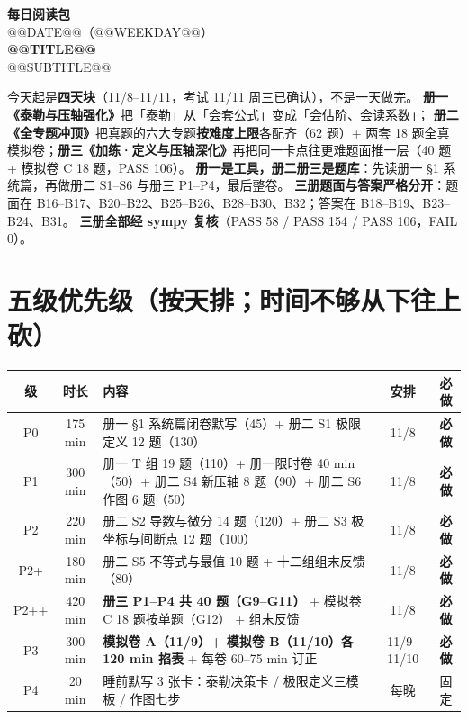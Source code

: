 \begin{center}
{\Huge\bfseries 每日阅读包}\\[0.25em]
{\LARGE @@DATE@@（@@WEEKDAY@@）}\\[0.45em]
{\Large\bfseries @@TITLE@@}\\[0.3em]
{\normalsize @@SUBTITLE@@}
\end{center}
\vspace{0.4em}
\begin{keypoint}[今天的一句话]
今天起是\textbf{四天块}（11/8--11/11，考试 11/11 周三已确认），不是一天做完。
\textbf{册一《泰勒与压轴强化》}把「泰勒」从「会套公式」变成「会估阶、会读系数」；
\textbf{册二《全专题冲顶》}把真题的六大专题\textbf{按难度上限}各配齐（62 题）+ 两套 18 题全真模拟卷；\textbf{册三《加练·定义与压轴深化》}再把同一卡点往更难题面推一层（40 题 + 模拟卷 C 18 题，PASS 106）。
\textbf{册一是工具，册二册三是题库}：先读册一 §1 系统篇，再做册二 S1--S6 与册三 P1--P4，最后整卷。
\textbf{三册题面与答案严格分开}：题面在 B16--B17、B20--B22、B25--B26、B28--B30、B32；答案在 B18--B19、B23--B24、B31。
\textbf{三册全部经 sympy 复核}（PASS 58 / PASS 154 / PASS 106，FAIL 0）。
\end{keypoint}

\section{五级优先级（按天排；时间不够从下往上砍）}
\begin{tabularx}{\linewidth}{c|c|p{6.4cm}|c|c}
\toprule
级 & 时长 & 内容 & 安排 & 必做 \\
\midrule
P0 & 175 min & 册一 §1 系统篇闭卷默写（45）+ 册二 S1 极限定义 12 题（130） & 11/8 & \textbf{必做} \\
P1 & 300 min & 册一 T 组 19 题（110）+ 册一限时卷 40 min（50）+ 册二 S4 新压轴 8 题（90）+ 册二 S6 作图 6 题（50） & 11/8 & \textbf{必做} \\
P2 & 220 min & 册二 S2 导数与微分 14 题（120）+ 册二 S3 极坐标与间断点 12 题（100） & 11/8 & \textbf{必做} \\
P2+ & 180 min & 册二 S5 不等式与最值 10 题 + 十二组组末反馈（80） & 11/8 & \textbf{必做} \\
P2++ & 420 min & \textbf{册三 P1--P4 共 40 题（G9--G11）} + 模拟卷 C 18 题按单题（G12） + 组末反馈 & 11/8 & \textbf{必做} \\
P3 & 300 min & \textbf{模拟卷 A（11/9）+ 模拟卷 B（11/10）各 120 min 掐表} + 每卷 60--75 min 订正 & 11/9--11/10 & \textbf{必做} \\
P4 & 20 min & 睡前默写 3 张卡：泰勒决策卡 / 极限定义三模板 / 作图七步 & 每晚 & 固定 \\
\bottomrule
\end{tabularx}

